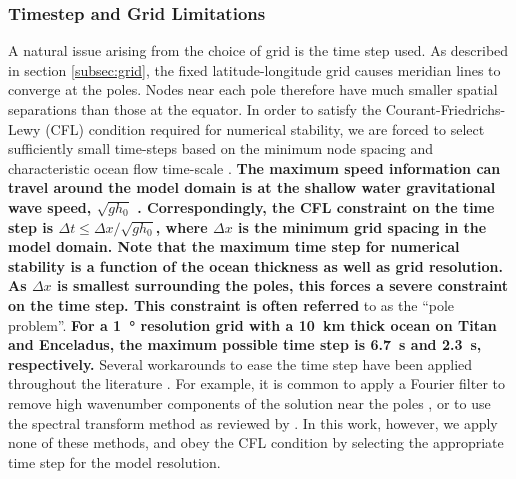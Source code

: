 \subsubsection{\textbf{Timestep and Grid Limitations} \label{subsubsec:grid_limits}}

A natural issue arising from the choice of grid is the time step used. As described in section \ref{subsec:grid}, the fixed latitude-longitude grid causes meridian lines to converge at the poles. Nodes near each pole therefore have much smaller spatial separations than those at the equator. In order to satisfy the Courant-Friedrichs-Lewy (CFL) condition required for numerical stability, we are forced to select sufficiently small time-steps based on the minimum node spacing and characteristic ocean flow time-scale \citep{arakawa1977computational,sears1995tidal}. \textbf{The maximum speed information can travel around the model domain is at the shallow water gravitational wave speed, $\sqrt{gh_0}$ \citep{lamb1932hydrodynamics}. Correspondingly, the CFL constraint on the time step is $\Delta t \leqslant \Delta x / \sqrt{gh_0}$, where $\Delta x$ is the minimum grid spacing in the model domain. Note that the maximum time step for numerical stability is a function of the ocean thickness as well as grid resolution. As $\Delta x$ is smallest surrounding the poles, this forces a severe constraint on the time step. This constraint is often referred} to as the ``pole problem''. \textbf{For a \SI{1}{\degree} resolution grid with a \SI{10}{\kilo\metre} thick ocean on Titan and Enceladus, the maximum possible time step is \SI{6.7}{\second} and \SI{2.3}{\second}, respectively.} Several workarounds to ease the time step have been applied throughout the literature \citep{comblen2009finite}. For example, it is common to apply a Fourier filter to remove high wavenumber components of the solution near the poles \citep{murray2002fourier}, or to use the spectral transform method as reviewed by \citet{swarztrauber1996spectral}. In this work, however, we apply none of these methods, and obey the CFL condition by selecting the appropriate time step for the model resolution.

